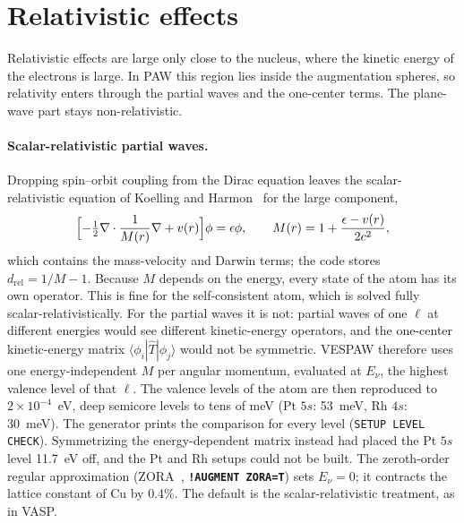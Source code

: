 \documentclass[11pt,a4paper,oneside]{book}
\newcommand{\key}[1]{\textbf{\texttt{#1}}}
\newcommand{\braket}[2]{\langle #1|#2\rangle}
\begin{document}
\section{Relativistic effects}\label{sec:relativity}

Relativistic effects are large only close to the nucleus, where the
kinetic energy of the electrons is large. In PAW this region lies inside
the augmentation spheres, so relativity enters through the partial waves
and the one-center terms. The plane-wave part stays non-relativistic.

\paragraph{Scalar-relativistic partial waves.} Dropping spin--orbit
coupling from the Dirac equation leaves the scalar-relativistic equation
of Koelling and Harmon~\cite{koelling77_jpc10_3107} for the large
component,
\begin{equation}
  \Bigl[-\tfrac12\nabla\cdot\frac1{M(r)}\nabla+v(r)\Bigr]\phi=\epsilon\phi,
  \qquad M(r)=1+\frac{\epsilon-v(r)}{2c^2},
  \label{eq:scalarrel}
\end{equation}
which contains the mass-velocity and Darwin terms; the code stores
$d_{\mathrm{rel}}=1/M-1$. Because $M$ depends on the energy, every state
of the atom has its own operator. This is fine for the self-consistent
atom, which is solved fully scalar-relativistically. For the partial waves
it is not: partial waves of one $\ell$ at different energies would see
different kinetic-energy operators, and the one-center kinetic-energy
matrix $\braket{\phi_i}{\hat T|\phi_j}$ would not be symmetric. VESPAW
therefore uses one energy-independent $M$ per angular momentum, evaluated
at $E_\nu$, the highest valence level of that $\ell$. The valence levels of
the atom are then reproduced to $2\times10^{-4}$~eV, deep semicore levels to
tens of meV (Pt $5s$: 53~meV, Rh $4s$: 30~meV). The generator prints the
comparison for every level (\texttt{SETUP LEVEL CHECK}). Symmetrizing the
energy-dependent matrix instead had placed the Pt $5s$ level 11.7~eV off,
and the Pt and Rh setups could not be built. The zeroth-order regular
approximation (ZORA~\cite{vanlenthe93_jcp99_4597}, \key{!AUGMENT ZORA=T})
sets $E_\nu=0$; it contracts the lattice constant of Cu by 0.4\%. The
default is the scalar-relativistic treatment, as in VASP.
\end{document}
